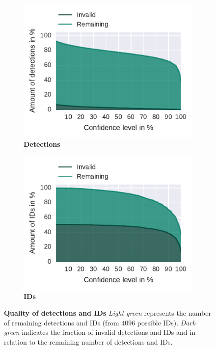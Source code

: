 \begin{figure}
    \centering
    \begin{subfigure}[b]{0.45\textwidth}
        \includegraphics[width=\textwidth]{Figures/detectionsWrongConf}
        \caption[Detections]{\textbf{Detections}}
        \label{fig:detections}
    \end{subfigure}
    \begin{subfigure}[b]{0.45\textwidth}
        \includegraphics[width=\textwidth]{Figures/idsWrongConf}
        \caption[IDs]{\textbf{IDs}}
        \label{fig:ids}
    \end{subfigure}
 	\caption[Quality of detections and IDs]{\textbf{Quality of detections and IDs} \emph{Light green} represents the number of remaining detections and IDs (from $4096$ possible IDs). \emph{Dark green} indicates the fraction of invalid detections and IDs and in relation to the remaining number of detections and IDs.\protect\footnotemark}
 	\label{fig:remainingVSquality}
\end{figure}

